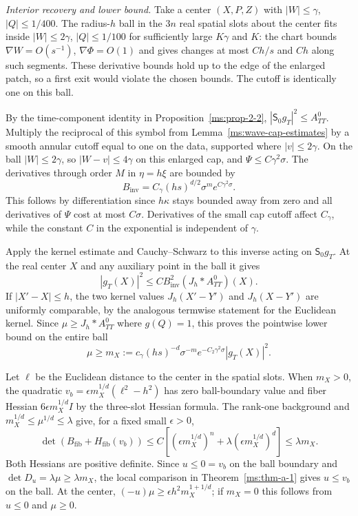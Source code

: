 \smallskip
\noindent\textit{Interior recovery and lower bound.}
Take a center $(X,P,Z)$ with $|W|\le\gamma$, $|Q|\le1/400$. The radius-$h$ ball in the $3n$ real spatial slots about the center fits inside $|W|\le2\gamma$, $|Q|\le1/100$ for sufficiently large $K\gamma$ and $K$: the chart bounds $\nabla W=O(s^{-1})$, $\nabla\Phi=O(1)$ and gives changes at most $Ch/s$ and $Ch$ along such segments. These derivative bounds hold up to the edge of the enlarged patch, so a first exit would violate the chosen bounds. The cutoff is identically one on this ball.

By the time-component identity in Proposition~\ref{ms:prop-2-2}, $|\mathsf S_0g_T|^2\le A^0_{TT}$. Multiply the reciprocal of this symbol from Lemma~\ref{ms:wave-cap-estimates} by a smooth annular cutoff equal to one on the data, supported where $|v|\le2\gamma$. On the ball $|W|\le2\gamma$, so $|W-v|\le4\gamma$ on this enlarged cap, and $\Psi\le C\gamma^2\sigma$. The derivatives through order $M$ in $\eta=h\xi$ are bounded by
\[
B_{\mathrm{inv}}=C_\gamma(hs)^{d/2}\sigma^me^{C\gamma^2\sigma}.
\]
This follows by differentiation since $h\kappa$ stays bounded away from zero and all derivatives of $\Psi$ cost at most $C\sigma$. Derivatives of the small cap cutoff affect $C_\gamma$, while the constant $C$ in the exponential is independent of $\gamma$.

Apply the kernel estimate and Cauchy--Schwarz to this inverse acting on $\mathsf S_0g_T$. At the real center $X$ and any auxiliary point in the ball it gives
\[
|g_T(X)|^2\le CB_{\mathrm{inv}}^2(J_h*A^0_{TT})(X).
\]
If $|X'-X|\le h$, the two kernel values $J_h(X'-Y')$ and $J_h(X-Y')$ are uniformly comparable, by the analogous termwise statement for the Euclidean kernel. Since $\mu\ge J_h*A^0_{TT}$ where $g(Q)=1$, this proves the pointwise lower bound on the entire ball
\[
\mu\ge m_X:=c_\gamma(hs)^{-d}\sigma^{-m}e^{-C_2\gamma^2\sigma}|g_T(X)|^2.
\]

Let $\ell$ be the Euclidean distance to the center in the spatial slots. When $m_X>0$, the quadratic $v_b=\epsilon m_X^{1/d}(\ell^2-h^2)$ has zero ball-boundary value and fiber Hessian $6\epsilon m_X^{1/d}I$ by the three-slot Hessian formula. The rank-one background and $m_X^{1/d}\le \mu^{1/d}\le\lambda$ give, for a fixed small $\epsilon>0$,
\[
\det(B_{\mathrm{fib}}+H_{\mathrm{fib}}(v_b))
\le C[(\epsilon m_X^{1/d})^n+\lambda(\epsilon m_X^{1/d})^d]
\le\lambda m_X .
\]
Both Hessians are positive definite. Since $u\le0=v_b$ on the ball boundary and $\det D_u=\lambda\mu\ge\lambda m_X$, the local comparison in Theorem~\ref{ms:thm-a-1} gives $u\le v_b$ on the ball. At the center, $(-u)\mu\ge\epsilon h^2m_X^{1+1/d}$; if $m_X=0$ this follows from $u\le0$ and $\mu\ge0$.

